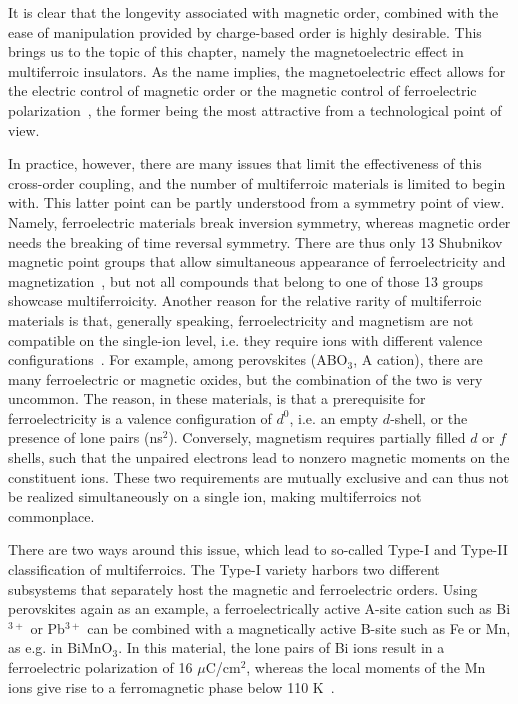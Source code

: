 It is clear that the longevity associated with magnetic order, combined with the ease of manipulation provided by charge-based order is highly desirable.
This brings us to the topic of this chapter, namely the magnetoelectric effect in multiferroic insulators.
As the name implies, the magnetoelectric effect allows for the electric control of magnetic order or the magnetic control of ferroelectric polarization~\cite{Spaldin2019,Khomskii2009,Fiebig2005,Fiebig2016,Cheong2007}, the former being the most attractive from a technological point of view.

In practice, however, there are many issues that limit the effectiveness of this cross-order coupling, and the number of multiferroic materials is limited to begin with.
This latter point can be partly understood from a symmetry point of view.
Namely, ferroelectric materials break inversion symmetry, whereas magnetic order needs the breaking of time reversal symmetry.
There are thus only 13 Shubnikov magnetic point groups that allow simultaneous appearance of ferroelectricity and magnetization~\cite{Wang2009}, but not all compounds that belong to one of those 13 groups showcase multiferroicity.
Another reason for the relative rarity of multiferroic materials is that, generally speaking, ferroelectricity and magnetism are not compatible on the single-ion level, i.e. they require ions with different valence configurations~\cite{Spaldin2019}.
For example, among perovskites (ABO$_3$, A cation), there are many ferroelectric or magnetic oxides, but the combination of the two is very uncommon.
The reason, in these materials, is that a prerequisite for ferroelectricity is a valence configuration of $d^0$, i.e. an empty $d$-shell, or the presence of lone pairs (ns$^2$).
Conversely, magnetism requires partially filled $d$ or $f$ shells, such that the unpaired electrons lead to nonzero magnetic moments on the constituent ions.
These two requirements are mutually exclusive and can thus not be realized simultaneously on a single ion, making multiferroics not commonplace.


There are two ways around this issue, which lead to so-called Type-I and Type-II classification of multiferroics\cite{Khomskii2009}.
The Type-I variety harbors two different subsystems that separately host the magnetic and ferroelectric orders.
Using perovskites again as an example, a ferroelectrically active A-site cation such as Bi$^{3+}$ or Pb$^{3+}$ can be combined with a magnetically active B-site such as Fe or Mn, as e.g. in BiMnO$_3$.
In this material, the lone pairs of Bi ions result in a ferroelectric polarization of 16 $\mu$C/cm$^2$, whereas the local moments of the Mn ions give rise to a ferromagnetic phase below 110 K~\cite{Wang2009}.

